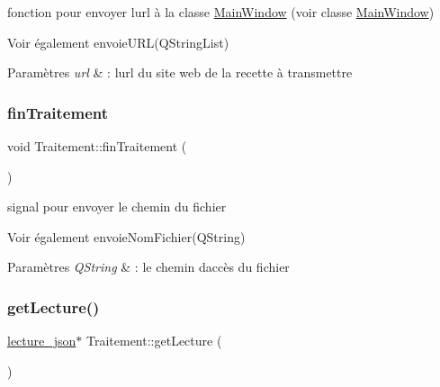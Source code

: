 fonction pour envoyer l\textquotesingle{}url à la classe \hyperlink{classMainWindow}{Main\+Window} (voir classe \hyperlink{classMainWindow}{Main\+Window}) 

\begin{DoxySeeAlso}{Voir également}
envoie\+U\+R\+L(\+Q\+String\+List) 
\end{DoxySeeAlso}

\begin{DoxyParams}{Paramètres}
{\em url} & \+: l\textquotesingle{}url du site web de la recette à transmettre \\
\hline
\end{DoxyParams}
\mbox{\label{classTraitement_a83495c6e878e66511b8af67ee369a012}} 
\subsubsection{\texorpdfstring{fin\+Traitement}{finTraitement}}
{\footnotesize\ttfamily void Traitement\+::fin\+Traitement (\begin{DoxyParamCaption}{ }\end{DoxyParamCaption})\hspace{0.3cm}{\ttfamily [signal]}}



signal pour envoyer le chemin du fichier 

\begin{DoxySeeAlso}{Voir également}
envoie\+Nom\+Fichier(\+Q\+String) 
\end{DoxySeeAlso}

\begin{DoxyParams}{Paramètres}
{\em Q\+String} & \+: le chemin d\textquotesingle{}accès du fichier \\
\hline
\end{DoxyParams}
\mbox{\label{classTraitement_a4392841087f03b430af24fa5233d6864}} 
\subsubsection{\texorpdfstring{get\+Lecture()}{getLecture()}}
{\footnotesize\ttfamily \hyperlink{classlecture__json}{lecture\+\_\+json}$\ast$ Traitement\+::get\+Lecture (\begin{DoxyParamCaption}{ }\end{DoxyParamCaption})\hspace{0.3cm}{\ttfamily [inline]}}

